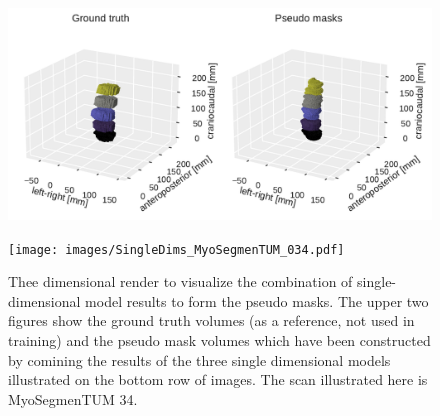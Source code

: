 \begin{figure}
    \centering
    \centering
    \begin{minipage}{.99\textwidth}
        \includegraphics[width=.99\textwidth]{images/GroundTruth_morphComb_MyoSegmenTUM_034.pdf}
    \end{minipage} 
    \vspace{2 mm}
    \begin{minipage}{.99\textwidth}
        \texttt{[image: images/SingleDims\_MyoSegmenTUM\_034.pdf]}
    \end{minipage} 
    \vspace{2 mm}
    \caption{Thee dimensional render to visualize the combination of single-dimensional model results to form the pseudo masks.
    The upper two figures show the ground truth volumes (as a reference, not used in training) and the pseudo mask volumes which have been constructed by comining the results of the three single dimensional models illustrated on the bottom row of images.
    The scan illustrated here is MyoSegmenTUM 34.
    \protect}
\end{figure}


